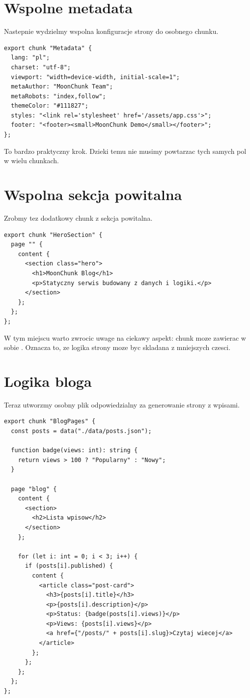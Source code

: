 \section{Wspolne metadata}
Nastepnie wydzielmy wspolna konfiguracje strony do osobnego chunku.

\begin{lstlisting}[style=moonchunk,caption={Plik metadata.mncnk}]
export chunk "Metadata" {
  lang: "pl";
  charset: "utf-8";
  viewport: "width=device-width, initial-scale=1";
  metaAuthor: "MoonChunk Team";
  metaRobots: "index,follow";
  themeColor: "#111827";
  styles: "<link rel='stylesheet' href='/assets/app.css'>";
  footer: "<footer><small>MoonChunk Demo</small></footer>";
};
\end{lstlisting}

To bardzo praktyczny krok. Dzieki temu nie musimy powtarzac tych samych pol w wielu
chunkach.

\section{Wspolna sekcja powitalna}
Zrobmy tez dodatkowy chunk z sekcja powitalna.

\begin{lstlisting}[style=moonchunk,caption={Plik sections.mncnk}]
export chunk "HeroSection" {
  page "" {
    content {
      <section class="hero">
        <h1>MoonChunk Blog</h1>
        <p>Statyczny serwis budowany z danych i logiki.</p>
      </section>
    };
  };
};
\end{lstlisting}

W tym miejscu warto zwrocic uwage na ciekawy aspekt: chunk moze zawierac w sobie
. Oznacza to, ze logika strony moze byc skladana z mniejszych czesci.

\section{Logika bloga}
Teraz utworzmy osobny plik odpowiedzialny za generowanie strony z wpisami.

\begin{lstlisting}[style=moonchunk,caption={Plik blog.mncnk}]
export chunk "BlogPages" {
  const posts = data("./data/posts.json");

  function badge(views: int): string {
    return views > 100 ? "Popularny" : "Nowy";
  }

  page "blog" {
    content {
      <section>
        <h2>Lista wpisow</h2>
      </section>
    };

    for (let i: int = 0; i < 3; i++) {
      if (posts[i].published) {
        content {
          <article class="post-card">
            <h3>{posts[i].title}</h3>
            <p>{posts[i].description}</p>
            <p>Status: {badge(posts[i].views)}</p>
            <p>Views: {posts[i].views}</p>
            <a href={"/posts/" + posts[i].slug}>Czytaj wiecej</a>
          </article>
        };
      };
    };
  };
};
\end{lstlisting}


